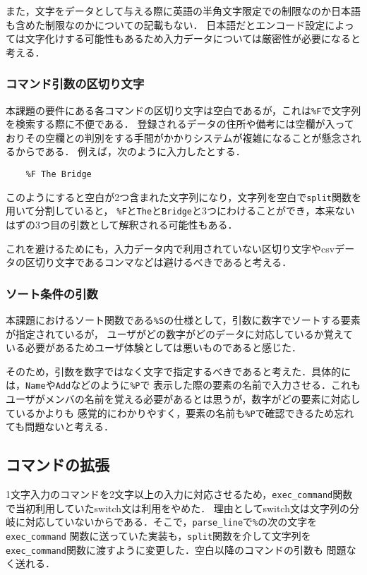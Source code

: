 \documentclass[a4j,11pt]{jarticle}
\begin{document}
また，文字をデータとして与える際に英語の半角文字限定での制限なのか日本語も含めた制限なのかについての記載もない．
日本語だとエンコード設定によっては文字化けする可能性もあるため入力データについては厳密性が必要になると考える．

\subsubsection{コマンド引数の区切り文字}
本課題の要件にある各コマンドの区切り文字は空白であるが，これは\verb|%F|で文字列を検索する際に不便である．
登録されるデータの住所や備考には空欄が入っておりその空欄との判別をする手間がかかりシステムが複雑になることが懸念されるからである．
例えば，次のように入力したとする．
\begin{verbatim}
    %F The Bridge
\end{verbatim}

このようにすると空白が2つ含まれた文字列になり，文字列を空白で\verb|split|関数を用いて分割していると，
\verb|%F|と\verb|The|と\verb|Bridge|と3つにわけることができ，本来ないはずの3つ目の引数として解釈される可能性もある．

これを避けるためにも，入力データ内で利用されていない区切り文字やcsvデータの区切り文字であるコンマなどは避けるべきであると考える．
\subsubsection{ソート条件の引数}
本課題におけるソート関数である\verb|%S|の仕様として，引数に数字でソートする要素が指定されているが，
ユーザがどの数字がどのデータに対応しているか覚えている必要があるためユーザ体験としては悪いものであると感じた．

そのため，引数を数字ではなく文字で指定するべきであると考えた．具体的には，\verb|Name|や\verb|Add|などのように\verb|%P|で
表示した際の要素の名前で入力させる．これもユーザがメンバの名前を覚える必要があるとは思うが，数字がどの要素に対応しているかよりも
感覚的にわかりやすく，要素の名前も\verb|%P|で確認できるため忘れても問題ないと考える．
\subsection{コマンドの拡張}
1文字入力のコマンドを2文字以上の入力に対応させるため，\verb|exec_command|関数で当初利用していたswitch文は利用をやめた．
理由としてswitch文は文字列の分岐に対応していないからである．そこで，\verb|parse_line|で\verb|%|の次の文字を\verb|exec_command|
関数に送っていた実装も，\verb|split|関数を介して文字列を\verb|exec_command|関数に渡すように変更した．空白以降のコマンドの引数も
問題なく送れる．
\end{document}
